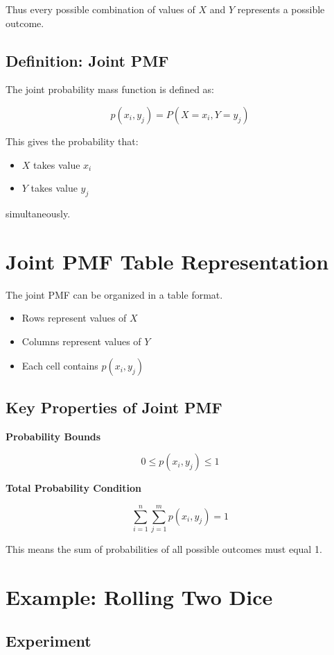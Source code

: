 \documentclass[12pt]{article}
\begin{document}
Thus every possible combination of values of \(X\) and \(Y\) represents a possible outcome.

\subsection*{Definition: Joint PMF}

The joint probability mass function is defined as:

\[
p(x_i, y_j) = P(X = x_i, Y = y_j)
\]

This gives the probability that:

\begin{itemize}
\item \(X\) takes value \(x_i\)
\item \(Y\) takes value \(y_j\)
\end{itemize}

simultaneously.

\section{Joint PMF Table Representation}

The joint PMF can be organized in a table format.

\begin{itemize}
\item Rows represent values of \(X\)
\item Columns represent values of \(Y\)
\item Each cell contains \(p(x_i,y_j)\)
\end{itemize}

\subsection*{Key Properties of Joint PMF}

\textbf{Probability Bounds}

\[
0 \le p(x_i, y_j) \le 1
\]

\textbf{Total Probability Condition}

\[
\sum_{i=1}^{n}\sum_{j=1}^{m} p(x_i, y_j) = 1
\]

This means the sum of probabilities of all possible outcomes must equal 1.

\section{Example: Rolling Two Dice}

\subsection*{Experiment}
\end{document}
